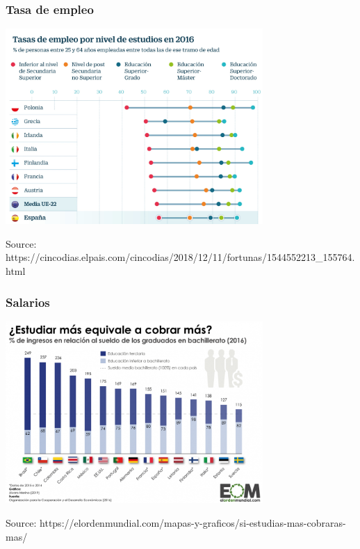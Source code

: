 
\begin{frame}
\frametitle{Tasa de empleo}


\begin{center}
  \includegraphics[width=9.8cm]{figs/tasa-empleo.jpg}
\end{center}

\vspace{-0.4cm}
\begin{flushright}
{\tiny
Source: https://cincodias.elpais.com/cincodias/2018/12/11/fortunas/1544552213\_155764.html
}
\end{flushright}

\end{frame}



\begin{frame}
\frametitle{Salarios}


\begin{center}
  \includegraphics[width=9.8cm]{figs/salarios.png}
\end{center}

\vspace{-0.4cm}
\begin{flushright}
{\tiny
Source: https://elordenmundial.com/mapas-y-graficos/si-estudias-mas-cobraras-mas/
}
\end{flushright}

\end{frame}
